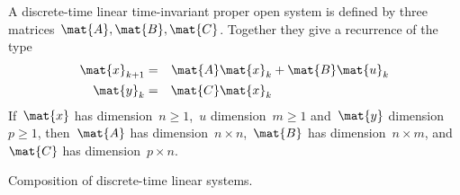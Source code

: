 \label{ex:discrete-time-linear}
\begin{definition}
  \label{def:dicrete-time-linear-system}
  A discrete-time linear time-invariant proper open system is defined by three matrices~$\mat{A},\mat{B},\mat{C}$.
  Together they give a recurrence of the type
  \begin{equation}
    \label{eq:discrete-time-dynamics}
    \begin{aligned}
      \mat{x}_{k+1} &=& \mat{A} \mat{x}_k & + \mat{B} \mat{u}_k \\
      \mat{y}_{k}   &=& \mat{C} \mat{x}_k  \\
    \end{aligned}
  \end{equation}
  If~$\mat{x}$ has dimension~$n\geq1$,~$u$ dimension~$m\geq1$ and~$\mat{y}$ dimension~$p\geq1$, then~$\mat{A}$ has dimension~$n \times n$,~$\mat{B}$ has dimension~$n \times m$, and~$\mat{C}$ has dimension~$p \times n$.
\end{definition}

\begin{marginfigure}
  \begin{center}
  \end{center}
  \caption{Composition of discrete-time linear systems.}
  \label{fig:comp_dyn_syst}
\end{marginfigure}

